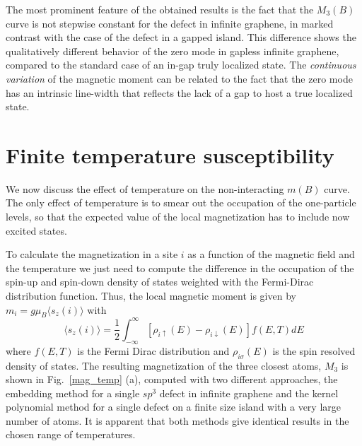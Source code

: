 \documentclass[aps,prb,twocolumn,superscriptaddress]{revtex4-1}
\begin{document}
The most prominent feature of the obtained results is the fact that the
$M_3(B)$ curve is not stepwise constant for the defect in infinite graphene, in marked contrast with the case of the defect in a gapped island.
This difference shows the qualitatively different behavior of the zero mode in gapless infinite graphene, compared to the standard case of an in-gap truly localized state. The \emph{continuous variation} of the magnetic moment can be related to the fact that the zero mode has an intrinsic line-width that reflects the lack of a gap to host a true localized state.




\section{Finite temperature susceptibility}
\label{sec:Temp}
We now discuss the effect of temperature on the non-interacting $m(B)$ curve. The only effect of temperature is to smear out the occupation of the one-particle levels, so that the expected value of the local magnetization has to include now excited states.

To calculate the magnetization in a site $i$  as a function of the magnetic field and the temperature we just need to compute the difference in the occupation of the spin-up and spin-down density of states weighted with the Fermi-Dirac distribution function. Thus, the local magnetic moment is given by $m_i = g\mu_B \langle s_z(i) \rangle$ with
\begin{equation}
       \langle s_z(i) \rangle = \frac{1}{2}
      \int^{\infty}_{-\infty}\left[
      \rho_{i\uparrow}(E)-\rho_{i \downarrow}(E)
      \right] f(E,T) dE
\label{mag_b_t}
\end{equation}
where $f(E,T)$ is the Fermi Dirac distribution and $\rho_{i\sigma}(E)$ is the
spin resolved density of states. The resulting magnetization of the three
closest atoms, $M_3$ is shown in Fig.~\ref{mag_temp} (a), computed with two
different approaches, the embedding method for a single $sp^3$ defect in
infinite graphene and the kernel polynomial method for a single defect on a
finite size island with a very large number of atoms.
It is apparent that both methods give identical results in the chosen range of temperatures.
\end{document}
